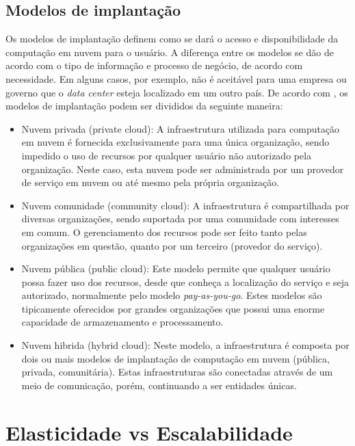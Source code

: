 \documentclass[twoside,english,brazilian]{UNISINOSartigo}
\begin{document}
\subsection{Modelos de implantação}
Os modelos de implantação definem como se dará o acesso e disponibilidade da computação em nuvem para o usuário. A diferença entre os modelos se dão de acordo com o tipo de informação e processo de negócio, de acordo com necessidade.  Em alguns casos, por exemplo, não é aceitável para uma empresa ou governo que o \textit{data center} esteja localizado em um outro país. De acordo com , os modelos de implantação podem ser divididos da seguinte maneira:
\begin{itemize}
	\item Nuvem privada (private cloud): A infraestrutura utilizada para computação em nuvem é fornecida exclusivamente para uma única organização, sendo impedido o uso de recursos por qualquer usuário não autorizado pela organização. Neste caso, esta nuvem pode ser administrada por um provedor de serviço em nuvem ou até mesmo pela própria organização.
	\item Nuvem comunidade (community cloud): A infraestrutura é compartilhada por diversas organizações, sendo suportada por uma comunidade com interesses em comum. O gerenciamento dos recursos pode ser feito tanto pelas organizações em questão, quanto por um terceiro (provedor do serviço).
	\item Nuvem pública (public cloud): Este modelo permite que qualquer usuário possa fazer uso dos recursos, desde que conheça a localização do serviço e seja autorizado, normalmente pelo modelo \textit{pay-as-you-go}. Estes modelos são tipicamente oferecidos por grandes organizações que possui uma enorme capacidade de armazenamento e processamento.
	\item Nuvem hibrida (hybrid cloud): Neste modelo, a infraestrutura é composta por dois ou mais modelos de implantação de computação em nuvem (pública, privada, comunitária). Estas infraestruturas são conectadas através de um meio de comunicação, porém, continuando a ser entidades únicas.
\end{itemize}

\section{Elasticidade vs Escalabilidade}
\label{elastic}
\end{document}
